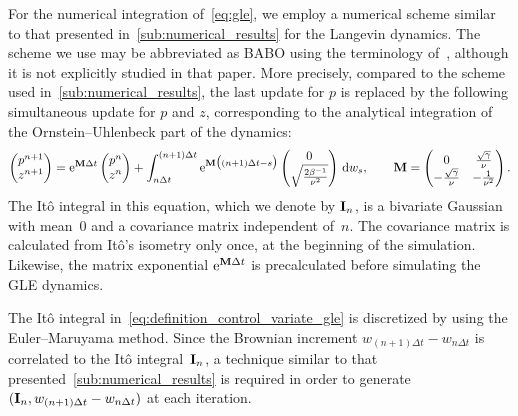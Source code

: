 \documentclass[11pt,a4paper]{article}
\begin{document}
For the numerical integration of~\eqref{eq:gle},
we employ a numerical scheme similar to that presented in~\cref{sub:numerical_results} for the Langevin dynamics.
The scheme we use may be abbreviated as BABO using the terminology of~\cite{MR4379630},
although it is not explicitly studied in that paper.
More precisely, compared to the scheme used in~\cref{sub:numerical_results},
the last update for $p$ is replaced by the following simultaneous update for $p$ and $z$,
corresponding to the analytical integration of the Ornstein--Uhlenbeck part of the dynamics:
\begin{equation*}
    \begin{pmatrix}
        p^{n+1} \\
        z^{n+1}
    \end{pmatrix}
    =
    \mathrm{e}^{\boldsymbol{\mathbf M} \Delta t}
    \begin{pmatrix}
        p^{n} \\
        z^{n}
    \end{pmatrix}
    + \int_{n \Delta t}^{(n+1)\Delta t} \mathrm{e}^{\boldsymbol{\mathbf M} \bigl((n+1) \Delta t - s\bigr)}
    \begin{pmatrix}
        0 \\
        \sqrt{\frac{2 \beta^{-1}}{\nu^2}}
    \end{pmatrix}
    \, \mathrm d w_s,
    \qquad \boldsymbol{\mathbf M} =
    \begin{pmatrix}
        0 & \frac{\sqrt{\gamma}}{\nu} \\
        - \frac{\sqrt{\gamma}}{\nu} & -   \frac{1}{\nu^2}
    \end{pmatrix}.
\end{equation*}
The It\^o integral in this equation, which we denote by $\boldsymbol{\mathbf I}_n$,
is a bivariate Gaussian with mean~0 and a covariance matrix independent of~$n$.
The covariance matrix is calculated from It\^o's isometry only once, at the beginning of the simulation.
Likewise, the matrix exponential $\mathrm{e}^{\boldsymbol{\mathbf M} \Delta t}$ is precalculated before simulating the GLE dynamics.

The It\^o integral in~\eqref{eq:definition_control_variate_gle} is discretized by using the Euler--Maruyama method.
Since the Brownian increment $w_{(n+1)\Delta t} - w_{n \Delta t}$ is correlated to the It\^o integral~$\boldsymbol{\mathbf I}_n$,
a technique similar to that presented~\cref{sub:numerical_results} is required in order to generate $(\boldsymbol{\mathbf I}_n, w_{(n+1)\Delta t} - w_{n \Delta t})$ at each iteration.
\end{document}
